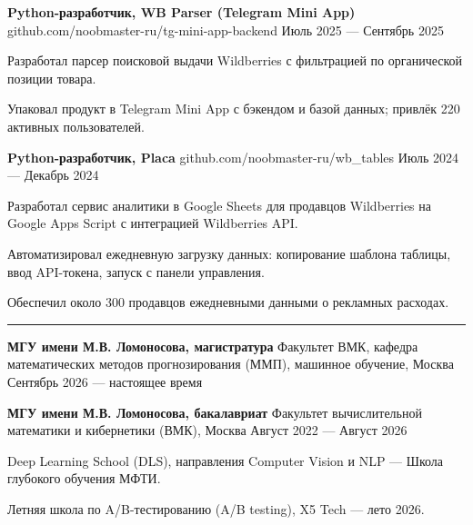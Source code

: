 \documentclass[10pt,a4paper]{article}
\newcommand{\cvsection}[1]{%
  \vspace{7pt}{\large\bfseries #1}\par\vspace{2pt}\hrule\vspace{4pt}}
\newcommand{\cventry}[3]{%
  \textbf{#1} \textbar{} #3 \textbar{} #2\par\vspace{2pt}}
\begin{document}
\cventry{Python-разработчик, WB Parser (Telegram Mini App)}{Июль 2025 --- Сентябрь 2025}{github.com/noobmaster-ru/tg-mini-app-backend}
\begin{cvitems}
    \item Разработал парсер поисковой выдачи Wildberries с фильтрацией по органической позиции товара.
    \item Упаковал продукт в Telegram Mini App с бэкендом и базой данных; привлёк 220 активных пользователей.
\end{cvitems}
\vspace{4pt}

\cventry{Python-разработчик, Placa}{Июль 2024 --- Декабрь 2024}{github.com/noobmaster-ru/wb\_tables}
\begin{cvitems}
    \item Разработал сервис аналитики в Google Sheets для продавцов Wildberries на Google Apps Script с интеграцией Wildberries API.
    \item Автоматизировал ежедневную загрузку данных: копирование шаблона таблицы, ввод API-токена, запуск с панели управления.
    \item Обеспечил около 300 продавцов ежедневными данными о рекламных расходах.
\end{cvitems}

\cvsection{Образование}
\cventry{МГУ имени М.В. Ломоносова, магистратура}{Сентябрь 2026 --- настоящее время}{Факультет ВМК, кафедра математических методов прогнозирования (ММП), машинное обучение, Москва}
\vspace{2pt}
\cventry{МГУ имени М.В. Ломоносова, бакалавриат}{Август 2022 --- Август 2026}{Факультет вычислительной математики и кибернетики (ВМК), Москва}
\begin{cvitems}
    \item Deep Learning School (DLS), направления Computer Vision и NLP --- Школа глубокого обучения МФТИ.
    \item Летняя школа по A/B-тестированию (A/B testing), X5 Tech --- лето 2026.
\end{cvitems}
\end{document}
